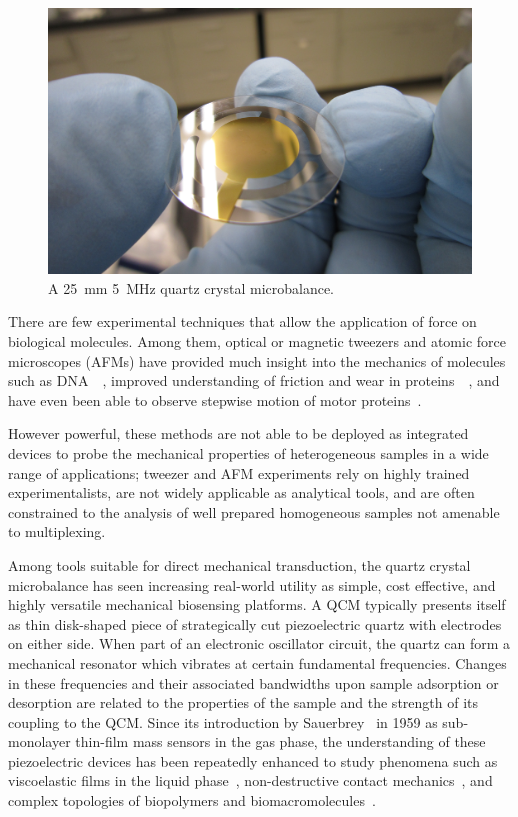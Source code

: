 \begin{figure}[ht]
 \centering
 \includegraphics[keepaspectratio,width=12cm]{qcm/figures/qcm_holding.jpg}
 \caption{A \SI{25}{\milli\meter} \SI{5}{\mega\hertz} quartz crystal microbalance.}
 \label{fig:qcmholding}
\end{figure}
There are few experimental techniques that allow the application of force
on biological molecules. Among them, optical or magnetic tweezers and
atomic force microscopes (AFMs) have provided much insight into the
mechanics of molecules such as
DNA~\cite{cui2000pulling}~\cite{marko1995stretching}, improved
understanding of friction and wear in
proteins~\cite{suda2001origin}~\cite{bormuth2009protein}, and have even
been able to observe stepwise motion of motor
proteins~\cite{asbury2003kinesin}.

However powerful, these methods are not able to be deployed as integrated
devices to probe the mechanical properties of heterogeneous samples in a
wide range of applications; tweezer and AFM experiments rely on highly
trained experimentalists, are not widely applicable as analytical tools,
and are often constrained to the analysis of well prepared homogeneous
samples not amenable to multiplexing.

Among tools suitable for direct mechanical transduction, the quartz crystal
microbalance has seen increasing real-world utility as simple, cost
effective, and highly versatile mechanical biosensing platforms. A QCM
typically presents itself as thin disk-shaped piece of strategically cut
piezoelectric quartz with electrodes on either side. When part of an
electronic oscillator circuit, the quartz can form a mechanical resonator
which vibrates at certain fundamental frequencies. Changes in these frequencies
and their associated bandwidths upon sample adsorption or desorption are
related to the properties of the sample and the strength of its coupling to
the QCM. Since its introduction by Sauerbrey~\cite{sauerbrey1959verwendung}
in 1959 as sub-monolayer thin-film mass sensors in the gas phase, the
understanding of these piezoelectric devices has been repeatedly enhanced
to study phenomena such as viscoelastic films in the liquid
phase~\cite{kanazawa1985frequency}, non-destructive contact
mechanics~\cite{johannsman2007contacts}, and complex topologies of
biopolymers and biomacromolecules~\cite{marx2003quartz}. 


